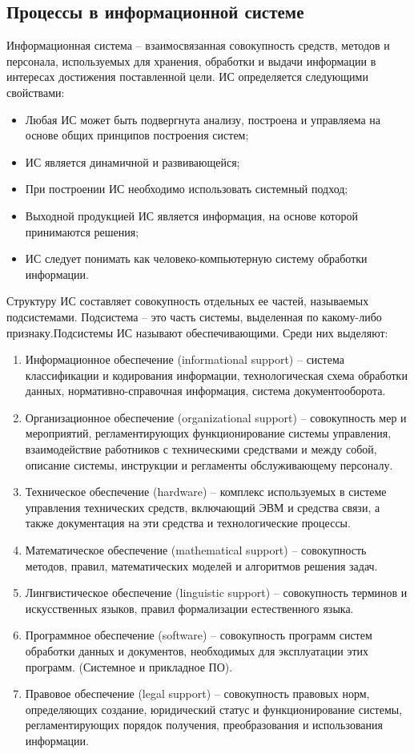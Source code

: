 \documentclass[a4paper]{article}
\begin{document}
\subsection{Процессы в информационной системе}
Информационная система – взаимосвязанная совокупность средств, методов и персонала, используемых для хранения, обработки и выдачи информации в интересах достижения поставленной цели.
  ИС определяется следующими свойствами:
  \begin{itemize}
    \item Любая ИС может быть подвергнута анализу, построена и управляема на основе общих принципов построения систем;
    \item ИС является динамичной и развивающейся;
    \item При построении ИС необходимо использовать системный подход;
    \item Выходной продукцией ИС является информация, на основе которой принимаются решения;
    \item ИС следует понимать как человеко-компьютерную систему обработки информации.
  \end{itemize}

  Структуру ИС составляет совокупность отдельных ее частей, называемых подсистемами. Подсистема – это часть системы, выделенная по какому-либо признаку.Подсистемы ИС называют обеспечивающими. Среди них выделяют:
  \begin{enumerate}
    \item Информационное обеспечение (informational support) – система классификации и кодирования информации, технологическая схема обработки данных, нормативно-справочная информация, система документооборота.
    \item Организационное обеспечение (organizational support) – совокупность мер и мероприятий, регламентирующих функционирование системы управления, взаимодействие работников с техническими средствами и между собой, описание системы, инструкции и регламенты обслуживающему персоналу.
    \item Техническое обеспечение (hardware) – комплекс используемых в системе управления технических средств, включающий ЭВМ и средства связи, а также документация на эти средства и технологические  процессы.
    \item Математическое обеспечение (mathematical support) – совокупность методов, правил, математических моделей и алгоритмов решения задач.
    \item Лингвистическое обеспечение (linguistic support) – совокупность терминов и искусственных языков, правил формализации естественного языка.
    \item Программное обеспечение (software) – совокупность программ систем обработки данных и документов, необходимых для эксплуатации этих программ. (Системное и прикладное ПО).
    \item Правовое обеспечение (legal support) – совокупность правовых норм, определяющих создание, юридический статус и функционирование системы, регламентирующих порядок получения, преобразования и использования информации.
  \end{enumerate}
  
\end{document}
